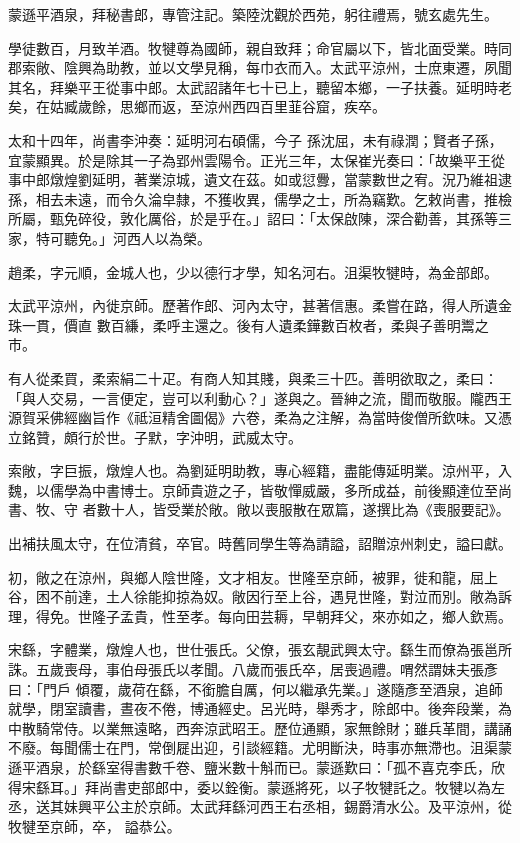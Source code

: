 \begin{pinyinscope}
 蒙遜平酒泉，拜秘書郎，專管注記。築陸沈觀於西苑，躬往禮焉，號玄處先生。



 學徒數百，月致羊酒。牧犍尊為國師，親自致拜；命官屬以下，皆北面受業。時同郡索敞、陰興為助教，並以文學見稱，每巾衣而入。太武平涼州，士庶東遷，夙聞其名，拜樂平王從事中郎。太武詔諸年七十已上，聽留本鄉，一子扶養。延明時老矣，在姑臧歲餘，思鄉而返，至涼州西四百里韮谷窟，疾卒。



 太和十四年，尚書李沖奏：延明河右碩儒，今子
 孫沈屈，未有祿潤；賢者子孫，宜蒙顯異。於是除其一子為郢州雲陽令。正光三年，太保崔光奏曰：「故樂平王從事中郎燉煌劉延明，著業涼城，遺文在茲。如或愆釁，當蒙數世之宥。況乃維祖逮孫，相去未遠，而令久淪皁隸，不獲收異，儒學之士，所為竊歎。乞敕尚書，推檢所屬，甄免碎役，敦化厲俗，於是乎在。」詔曰：「太保啟陳，深合勸善，其孫等三家，特可聽免。」河西人以為榮。



 趙柔，字元順，金城人也，少以德行才學，知名河右。沮渠牧犍時，為金部郎。



 太武平涼州，內徙京師。歷著作郎、河內太守，甚著信惠。柔嘗在路，得人所遺金珠一貫，價直
 數百縑，柔呼主還之。後有人遺柔鏵數百枚者，柔與子善明鬻之市。



 有人從柔買，柔索絹二十疋。有商人知其賤，與柔三十匹。善明欲取之，柔曰：「與人交易，一言便定，豈可以利動心？」遂與之。晉紳之流，聞而敬服。隴西王源賀采佛經幽旨作《祗洹精舍圖偈》六卷，柔為之注解，為當時俊僧所欽味。又憑立銘贊，頗行於世。子默，字沖明，武威太守。



 索敞，字巨振，燉煌人也。為劉延明助教，專心經籍，盡能傳延明業。涼州平，入魏，以儒學為中書博士。京師貴遊之子，皆敬憚威嚴，多所成益，前後顯達位至尚書、牧、守
 者數十人，皆受業於敞。敞以喪服散在眾篇，遂撰比為《喪服要記》。



 出補扶風太守，在位清貧，卒官。時舊同學生等為請謚，詔贈涼州刺史，謚曰獻。



 初，敞之在涼州，與鄉人陰世隆，文才相友。世隆至京師，被罪，徙和龍，屈上谷，困不前達，土人徐能抑掠為奴。敞因行至上谷，遇見世隆，對泣而別。敞為訴理，得免。世隆子孟貴，性至孝。每向田芸耨，早朝拜父，來亦如之，鄉人欽焉。



 宋繇，字體業，燉煌人也，世仕張氏。父僚，張玄靚武興太守。繇生而僚為張邕所誅。五歲喪母，事伯母張氏以孝聞。八歲而張氏卒，居喪過禮。喟然謂妹夫張彥曰：「門戶
 傾覆，歲荷在繇，不銜膽自厲，何以繼承先業。」遂隨彥至酒泉，追師就學，閉室讀書，晝夜不倦，博通經史。呂光時，舉秀才，除郎中。後奔段業，為中散騎常侍。以業無遠略，西奔涼武昭王。歷位通顯，家無餘財；雖兵革間，講誦不廢。每聞儒士在門，常倒屣出迎，引談經籍。尤明斷決，時事亦無滯也。沮渠蒙遜平酒泉，於繇室得書數千卷、鹽米數十斛而已。蒙遜歎曰：「孤不喜克李氏，欣得宋繇耳。」拜尚書吏部郎中，委以銓衡。蒙遜將死，以子牧犍託之。牧犍以為左丞，送其妹興平公主於京師。太武拜繇河西王右丞相，錫爵清水公。及平涼州，從牧犍至京師，卒，
 謚恭公。




\end{pinyinscope}
